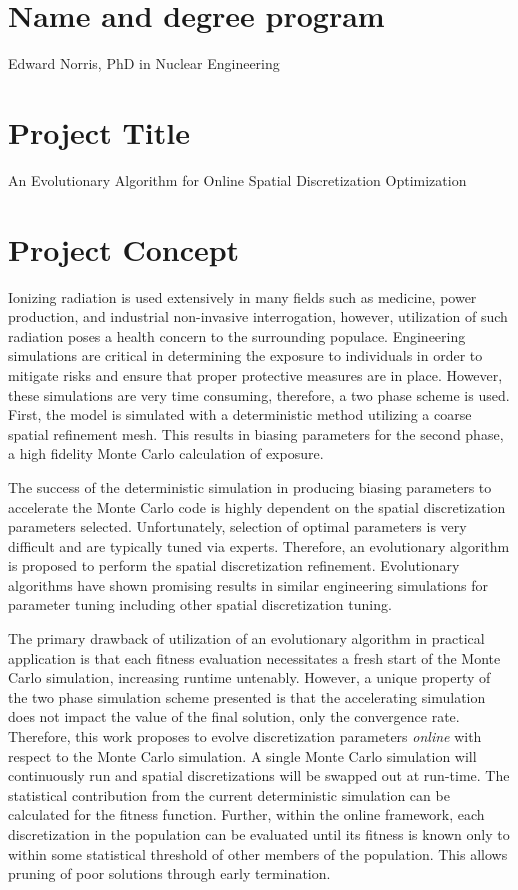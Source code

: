 \documentclass{article}
\begin{document}
 
\section{Name and degree program}
 
Edward Norris, PhD in Nuclear Engineering

\section{Project Title}

An Evolutionary Algorithm for Online Spatial Discretization Optimization

\section{Project Concept}

Ionizing radiation is used extensively in many fields such as medicine, power production, and industrial non-invasive interrogation, however, utilization of such radiation poses a health concern to the surrounding populace. Engineering simulations are critical in determining the exposure to individuals in order to mitigate risks and ensure that proper protective measures are in place. However, these simulations are very time consuming, therefore, a two phase scheme is used. First, the model is simulated with a deterministic method utilizing a coarse spatial refinement mesh. This results in biasing parameters for the second phase, a high fidelity Monte Carlo calculation of exposure.

The success of the deterministic simulation in producing biasing parameters to accelerate the Monte Carlo code is highly dependent on the spatial discretization parameters selected. Unfortunately, selection of optimal parameters is very difficult and are typically tuned via experts. Therefore, an evolutionary algorithm is proposed to perform the spatial discretization refinement. Evolutionary algorithms have shown promising results in similar engineering simulations for parameter tuning including other spatial discretization tuning.

The primary drawback of utilization of an evolutionary algorithm in practical application is that each fitness evaluation necessitates a fresh start of the Monte Carlo simulation, increasing runtime untenably. However, a unique property of the two phase simulation scheme presented is that the accelerating simulation does not impact the value of the final solution, only the convergence rate. Therefore, this work proposes to evolve discretization parameters \textit{online} with respect to the Monte Carlo simulation. A single Monte Carlo simulation will continuously run and spatial discretizations will be swapped out at run-time. The statistical contribution from the current deterministic simulation can be calculated for the fitness function. Further, within the online framework, each discretization in the population can be evaluated until its fitness is known only to within some statistical threshold of other members of the population. This allows pruning of poor solutions through early termination.
\end{document}
